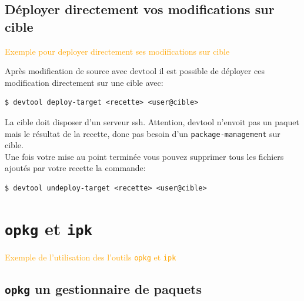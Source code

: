 \documentclass[compress]{beamer}
\begin{document}
\subsection{Déployer directement vos modifications sur cible}

\begin{frame}
\begin{center}
\textcolor{orange}{\huge{Exemple pour deployer directement ses modifications sur cible}}
\end{center}
\end{frame}

\begin{frame}[fragile]
Après modification de source avec devtool il est possible de déployer ces modification directement sur une cible avec:
\begin{lstlisting}[style=shell]
$ devtool deploy-target <recette> <user@cible>
\end{lstlisting}
La cible doit disposer d'un serveur ssh. \newline
\newline
Attention, devtool n'envoit pas un paquet mais le résultat de la recette, donc pas besoin d'un \texttt{package-management} sur cible.\\
Une fois votre mise au point terminée vous pouvez supprimer tous les fichiers ajoutés par votre recette la commande:
\begin{lstlisting}[style=shell]
$ devtool undeploy-target <recette> <user@cible>
\end{lstlisting}
\end{frame}


\section{\texttt{opkg} et \texttt{ipk}}

\begin{frame}
\end{frame}

\begin{frame}
\begin{center}
\textcolor{orange}{\huge{Exemple de l'utilisation des l'outils \texttt{opkg} et \texttt{ipk}}}
\end{center}
\end{frame}

\subsection{\texttt{opkg} un gestionnaire de paquets}
\end{document}

